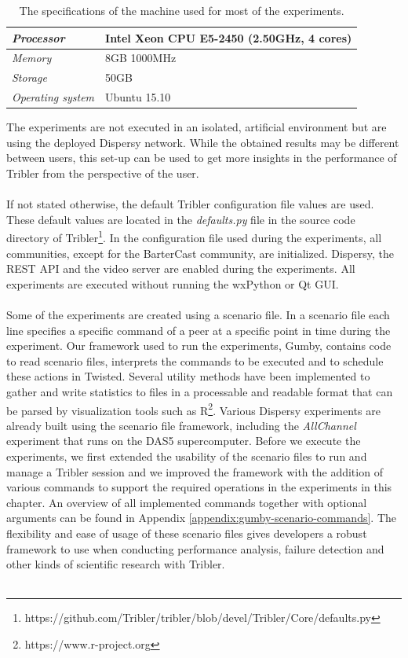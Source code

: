 \begin{table}[h!]
	\centering
	\begin{tabular}{|l|l|}
		\hline
		\emph{Processor} & Intel Xeon CPU E5-2450 (2.50GHz, 4 cores)\\ \hline
		\emph{Memory} & 8GB 1000MHz \\ \hline
		\emph{Storage} & 50GB \\ \hline
		\emph{Operating system} & Ubuntu 15.10 \\ \hline
	\end{tabular}
	\caption{The specifications of the machine used for most of the experiments.}
	\label{table:experiments-server-specifications}
\end{table}

\noindent The experiments are not executed in an isolated, artificial environment but are using the deployed Dispersy network. While the obtained results may be different between users, this set-up can be used to get more insights in the performance of Tribler from the perspective of the user.\\\\
If not stated otherwise, the default Tribler configuration file values are used. These default values are located in the \emph{defaults.py} file in the source code directory of Tribler\footnote{https://github.com/Tribler/tribler/blob/devel/Tribler/Core/defaults.py}. In the configuration file used during the experiments, all communities, except for the BarterCast community, are initialized. Dispersy, the REST API and the video server are enabled during the experiments. All experiments are executed without running the wxPython or Qt GUI.\\\\
Some of the experiments are created using a scenario file. In a scenario file each line specifies a specific command of a peer at a specific point in time during the experiment. Our framework used to run the experiments, Gumby, contains code to read scenario files, interprets the commands to be executed and to schedule these actions in Twisted. Several utility methods have been implemented to gather and write statistics to files in a processable and readable format that can be parsed by visualization tools such as R\footnote{https://www.r-project.org}. Various Dispersy experiments are already built using the scenario file framework, including the \emph{AllChannel} experiment that runs on the DAS5 supercomputer. Before we execute the experiments, we first extended the usability of the scenario files to run and manage a Tribler session and we improved the framework with the addition of various commands to support the required operations in the experiments in this chapter. An overview of all implemented commands together with optional arguments can be found in Appendix \ref{appendix:gumby-scenario-commands}. The flexibility and ease of usage of these scenario files gives developers a robust framework to use when conducting performance analysis, failure detection and other kinds of scientific research with Tribler.\\\\
